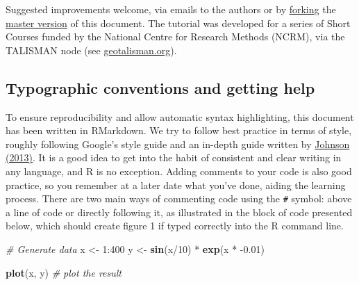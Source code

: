 \documentclass[]{article}
\newenvironment{Shaded}{}{}
\newcommand{\KeywordTok}[1]{\textcolor[rgb]{0.00,0.44,0.13}{\textbf{{#1}}}}
\newcommand{\DecValTok}[1]{\textcolor[rgb]{0.25,0.63,0.44}{{#1}}}
\newcommand{\FloatTok}[1]{\textcolor[rgb]{0.25,0.63,0.44}{{#1}}}
\newcommand{\StringTok}[1]{\textcolor[rgb]{0.25,0.44,0.63}{{#1}}}
\newcommand{\CommentTok}[1]{\textcolor[rgb]{0.38,0.63,0.69}{\textit{{#1}}}}
\newcommand{\NormalTok}[1]{{#1}}
\begin{document}
Suggested improvements welcome, via emails to the authors or by
\href{https://help.github.com/articles/fork-a-repo}{forking} the
\href{https://github.com/Robinlovelace/Creating-maps-in-R/blob/master/intro-spatial.Rmd}{master
version} of this document. The tutorial was developed for a series of
Short Courses funded by the National Centre for Research Methods (NCRM),
via the TALISMAN node (see
\href{http://www.geotalisman.org/}{geotalisman.org}).

\subsection{Typographic conventions and getting
help}\label{typographic-conventions-and-getting-help}

To ensure reproducibility and allow automatic syntax highlighting, this
document has been written in RMarkdown. We try to follow best practice
in terms of style, roughly following Google's style guide and an
in-depth guide written by
\href{http://cran.r-project.org/web/packages/rockchalk/vignettes/Rstyle.pdf}{Johnson
(2013)}. It is a good idea to get into the habit of consistent and clear
writing in any language, and R is no exception. Adding comments to your
code is also good practice, so you remember at a later date what you've
done, aiding the learning process. There are two main ways of commenting
code using the \texttt{\#} symbol: above a line of code or directly
following it, as illustrated in the block of code presented below, which
should create figure 1 if typed correctly into the R command line.

\begin{Shaded}
\begin{Highlighting}[]
\CommentTok{# Generate data}
\NormalTok{x <-}\StringTok{ }\DecValTok{1}\NormalTok{:}\DecValTok{400}
\NormalTok{y <-}\StringTok{ }\KeywordTok{sin}\NormalTok{(x/}\DecValTok{10}\NormalTok{) *}\StringTok{ }\KeywordTok{exp}\NormalTok{(x *}\StringTok{ }\NormalTok{-}\FloatTok{0.01}\NormalTok{)}

\KeywordTok{plot}\NormalTok{(x, y)  }\CommentTok{# plot the result}
\end{Highlighting}
\end{Shaded}
\end{document}
